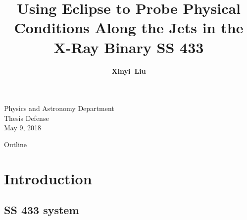 \documentclass{beamer}
\title[] 
{Using Eclipse to Probe Physical Conditions Along the Jets in the X-Ray Binary SS 433%
}
\author[Liu]
{
  \textbf{Xinyi~Liu}\inst{1}
}
\institute[Wheaton College]
{
  \inst{1}%
 Wheaton College, MA
}
\date[\today]
\begin{document}
\begin{frame}
  \titlepage
 Physics and Astronomy Department\\
 Thesis Defense \\
 May 9, 2018
  
\end{frame}

\begin{frame}{Outline}
  \tableofcontents
\end{frame}


\section{Introduction}

    
\subsection{SS 433 system}
    
\end{document}
